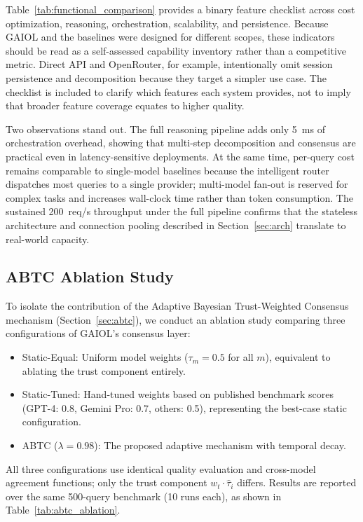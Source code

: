 \documentclass{iopjournal}
\begin{document}
Table~\ref{tab:functional_comparison} provides a binary feature checklist across cost optimization, reasoning, orchestration, scalability, and persistence. Because GAIOL and the baselines were designed for different scopes, these indicators should be read as a self-assessed capability inventory rather than a competitive metric. Direct API and OpenRouter, for example, intentionally omit session persistence and decomposition because they target a simpler use case. The checklist is included to clarify which features each system provides, not to imply that broader feature coverage equates to higher quality.

Two observations stand out. The full reasoning pipeline adds only 5~ms of orchestration overhead, showing that multi-step decomposition and consensus are practical even in latency-sensitive deployments. At the same time, per-query cost remains comparable to single-model baselines because the intelligent router dispatches most queries to a single provider; multi-model fan-out is reserved for complex tasks and increases wall-clock time rather than token consumption. The sustained 200~req/s throughput under the full pipeline confirms that the stateless architecture and connection pooling described in Section~\ref{sec:arch} translate to real-world capacity.

\subsection{ABTC Ablation Study}
\label{sec:abtc_ablation}

To isolate the contribution of the Adaptive Bayesian Trust-Weighted Consensus mechanism (Section~\ref{sec:abtc}), we conduct an ablation study comparing three configurations of GAIOL's consensus layer:

\begin{itemize}
    \item Static-Equal: Uniform model weights ($\tau_m = 0.5$ for all $m$), equivalent to ablating the trust component entirely.
    \item Static-Tuned: Hand-tuned weights based on published benchmark scores (GPT-4: 0.8, Gemini Pro: 0.7, others: 0.5), representing the best-case static configuration.
    \item ABTC ($\lambda = 0.98$): The proposed adaptive mechanism with temporal decay.
\end{itemize}

All three configurations use identical quality evaluation and cross-model agreement functions; only the trust component $w_t \cdot \hat{\tau}_i$ differs. Results are reported over the same 500-query benchmark (10 runs each), as shown in Table~\ref{tab:abtc_ablation}.
\end{document}
